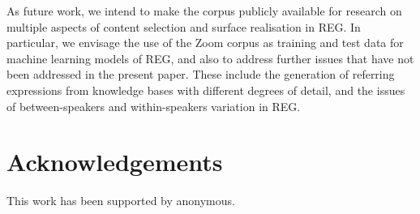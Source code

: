 \documentclass{article}
\begin{document}
As future work, we intend to make the corpus publicly available for research on multiple aspects of content selection and surface realisation in REG. In particular, we envisage the use of the Zoom corpus as training and test data for machine learning models of REG, and also to address further issues that have not been addressed in the present paper. These include  the generation of referring expressions from knowledge bases with different degrees of detail, and the issues of between-speakers and within-speakers variation in REG.


\section*{Acknowledgements}
This work has been supported by anonymous. 

\clearpage

\end{document}
